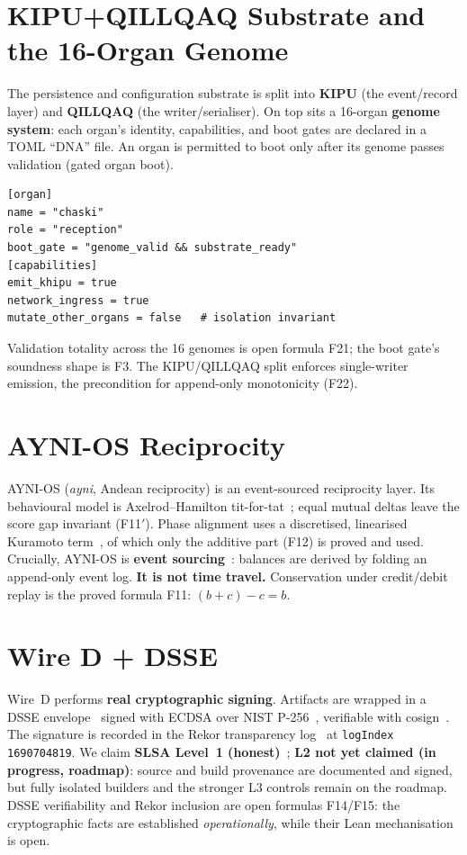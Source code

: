 \documentclass[11pt]{article}
\theoremstyle{plain}
\theoremstyle{definition}
\theoremstyle{remark}
\begin{document}
\section{KIPU+QILLQAQ Substrate and the 16-Organ Genome}
\label{sec:kipu}
The persistence and configuration substrate is split into \textbf{KIPU} (the
event/record layer) and \textbf{QILLQAQ} (the writer/serialiser). On top sits a 16-organ
\textbf{genome system}: each organ's identity, capabilities, and boot gates are declared
in a TOML ``DNA'' file. An organ is permitted to boot only after its genome passes
validation (gated organ boot).
\begin{lstlisting}
[organ]
name = "chaski"
role = "reception"
boot_gate = "genome_valid && substrate_ready"
[capabilities]
emit_khipu = true
network_ingress = true
mutate_other_organs = false   # isolation invariant
\end{lstlisting}
Validation totality across the 16 genomes is open formula F21; the boot gate's soundness
shape is F3. The KIPU/QILLQAQ split enforces single-writer emission, the precondition for
append-only monotonicity (F22).

\section{AYNI-OS Reciprocity}
\label{sec:ayni}
AYNI-OS (\emph{ayni}, Andean reciprocity) is an event-sourced reciprocity layer. Its
behavioural model is Axelrod--Hamilton tit-for-tat~\cite{axelrod1981}; equal mutual
deltas leave the score gap invariant (F11$'$). Phase alignment uses a discretised,
linearised Kuramoto term~\cite{kuramoto1975}, of which only the additive part (F12) is
proved and used. Crucially, AYNI-OS is \textbf{event sourcing}~\cite{fowler2005}: balances
are derived by folding an append-only event log. \textbf{It is not time travel.}
Conservation under credit/debit replay is the proved formula F11: $(b+c)-c=b$.

\section{Wire D + DSSE}
\label{sec:wired}
Wire~D performs \textbf{real cryptographic signing}. Artifacts are wrapped in a DSSE
envelope~\cite{dsse2021} signed with ECDSA over NIST P-256~\cite{fips1864}, verifiable
with cosign~\cite{cosign2021}. The signature is recorded in the Rekor transparency
log~\cite{rekor2021} at \texttt{logIndex 1690704819}. We claim \textbf{SLSA Level~1
(honest)}~\cite{slsa}; \textbf{L2 not yet claimed (in progress, roadmap)}: source and
build provenance are documented and signed, but fully isolated builders and the stronger
L3 controls remain on the roadmap. DSSE verifiability and Rekor inclusion are open
formulas F14/F15: the cryptographic facts are established \emph{operationally}, while
their Lean mechanisation is open.
\end{document}
